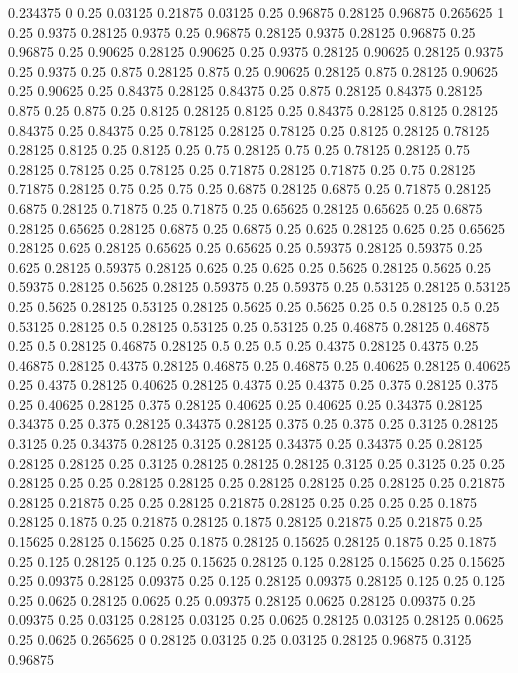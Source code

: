 0.234375 0
0.25 0.03125
0.21875 0.03125
0.25 0.96875
0.28125 0.96875
0.265625 1
0.25 0.9375
0.28125 0.9375
0.25 0.96875
0.28125 0.9375
0.28125 0.96875
0.25 0.96875
0.25 0.90625
0.28125 0.90625
0.25 0.9375
0.28125 0.90625
0.28125 0.9375
0.25 0.9375
0.25 0.875
0.28125 0.875
0.25 0.90625
0.28125 0.875
0.28125 0.90625
0.25 0.90625
0.25 0.84375
0.28125 0.84375
0.25 0.875
0.28125 0.84375
0.28125 0.875
0.25 0.875
0.25 0.8125
0.28125 0.8125
0.25 0.84375
0.28125 0.8125
0.28125 0.84375
0.25 0.84375
0.25 0.78125
0.28125 0.78125
0.25 0.8125
0.28125 0.78125
0.28125 0.8125
0.25 0.8125
0.25 0.75
0.28125 0.75
0.25 0.78125
0.28125 0.75
0.28125 0.78125
0.25 0.78125
0.25 0.71875
0.28125 0.71875
0.25 0.75
0.28125 0.71875
0.28125 0.75
0.25 0.75
0.25 0.6875
0.28125 0.6875
0.25 0.71875
0.28125 0.6875
0.28125 0.71875
0.25 0.71875
0.25 0.65625
0.28125 0.65625
0.25 0.6875
0.28125 0.65625
0.28125 0.6875
0.25 0.6875
0.25 0.625
0.28125 0.625
0.25 0.65625
0.28125 0.625
0.28125 0.65625
0.25 0.65625
0.25 0.59375
0.28125 0.59375
0.25 0.625
0.28125 0.59375
0.28125 0.625
0.25 0.625
0.25 0.5625
0.28125 0.5625
0.25 0.59375
0.28125 0.5625
0.28125 0.59375
0.25 0.59375
0.25 0.53125
0.28125 0.53125
0.25 0.5625
0.28125 0.53125
0.28125 0.5625
0.25 0.5625
0.25 0.5
0.28125 0.5
0.25 0.53125
0.28125 0.5
0.28125 0.53125
0.25 0.53125
0.25 0.46875
0.28125 0.46875
0.25 0.5
0.28125 0.46875
0.28125 0.5
0.25 0.5
0.25 0.4375
0.28125 0.4375
0.25 0.46875
0.28125 0.4375
0.28125 0.46875
0.25 0.46875
0.25 0.40625
0.28125 0.40625
0.25 0.4375
0.28125 0.40625
0.28125 0.4375
0.25 0.4375
0.25 0.375
0.28125 0.375
0.25 0.40625
0.28125 0.375
0.28125 0.40625
0.25 0.40625
0.25 0.34375
0.28125 0.34375
0.25 0.375
0.28125 0.34375
0.28125 0.375
0.25 0.375
0.25 0.3125
0.28125 0.3125
0.25 0.34375
0.28125 0.3125
0.28125 0.34375
0.25 0.34375
0.25 0.28125
0.28125 0.28125
0.25 0.3125
0.28125 0.28125
0.28125 0.3125
0.25 0.3125
0.25 0.25
0.28125 0.25
0.25 0.28125
0.28125 0.25
0.28125 0.28125
0.25 0.28125
0.25 0.21875
0.28125 0.21875
0.25 0.25
0.28125 0.21875
0.28125 0.25
0.25 0.25
0.25 0.1875
0.28125 0.1875
0.25 0.21875
0.28125 0.1875
0.28125 0.21875
0.25 0.21875
0.25 0.15625
0.28125 0.15625
0.25 0.1875
0.28125 0.15625
0.28125 0.1875
0.25 0.1875
0.25 0.125
0.28125 0.125
0.25 0.15625
0.28125 0.125
0.28125 0.15625
0.25 0.15625
0.25 0.09375
0.28125 0.09375
0.25 0.125
0.28125 0.09375
0.28125 0.125
0.25 0.125
0.25 0.0625
0.28125 0.0625
0.25 0.09375
0.28125 0.0625
0.28125 0.09375
0.25 0.09375
0.25 0.03125
0.28125 0.03125
0.25 0.0625
0.28125 0.03125
0.28125 0.0625
0.25 0.0625
0.265625 0
0.28125 0.03125
0.25 0.03125
0.28125 0.96875
0.3125 0.96875
